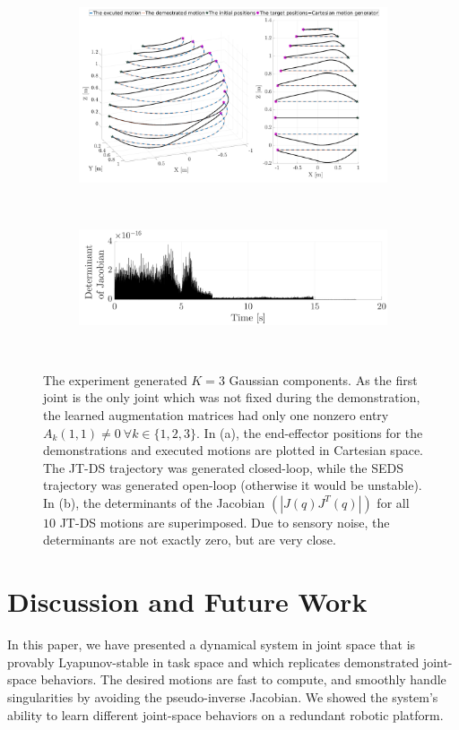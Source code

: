 \documentclass[letterpaper, 10 pt, conference,fleqn]{ieeeconf}
\begin{document}
\begin{figure}[h]
	\begin{subfigure}[t]{\linewidth}
		\includegraphics[width=\linewidth]{Pic/cropped_Sing_1.pdf}
		\caption{ }
		\label{fig:Sin}
	\end{subfigure}\\
	\begin{subfigure}[t]{\linewidth}
		\includegraphics[width=\linewidth]{Pic/cropped_Sing_2.pdf}
		\caption{ }
		\label{fig:Det}
	\end{subfigure}\\
	\caption{The experiment generated $K=3$ Gaussian components. As the first joint is the only joint which was not fixed during the demonstration, the learned augmentation matrices had only one nonzero entry $A_k(1,1)\neq0~\forall k\in \{1, 2, 3\} $.  In (a), the end-effector positions for the demonstrations and executed motions are plotted in Cartesian space. The JT-DS trajectory was generated closed-loop, while the SEDS trajectory was generated open-loop (otherwise it would be unstable). In (b), the determinants of the Jacobian $(|J(q)J^T(q)|)$ for all $10$ JT-DS motions are superimposed. Due to sensory noise, the determinants are not exactly zero, but are very close.  }
	\vspace{-20pt}
\end{figure}

\section{Discussion and Future Work} 
\label{Sec:Dis}
In this paper, we have presented a dynamical system in joint space that is provably Lyapunov-stable in task space and which replicates demonstrated joint-space behaviors. The desired motions are fast to compute, and smoothly handle singularities by avoiding the pseudo-inverse Jacobian. We showed the system's ability to learn different joint-space behaviors on a redundant robotic platform.
\end{document}
